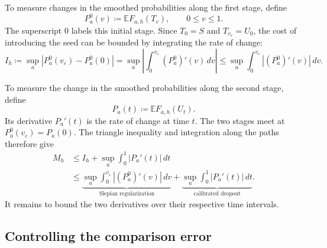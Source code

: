 \documentclass[11pt,letterpaper,twoside,leqno]{article}
\theoremstyle{bookplain}
\theoremstyle{bookremark}
\newcommand{\E}{\mathbb E}
\begin{document}
{
To measure changes in the smoothed probabilities along the first stage, {define}
\[
 P_a^0(v)\coloneqq\E F_{a,h}(T_v),\qquad 0\le v\le1.
\]
The superscript \(0\) labels this initial stage. Since
\(T_0=S\) and \(T_{v_\varepsilon}=U_0\), the cost of introducing the seed
can be bounded by integrating the rate of change:
\[
 I_h\coloneqq\sup_a|P_a^0(v_\varepsilon)-P_a^0(0)|
 =\sup_a\left|\int_0^{v_\varepsilon}(P_a^0)'(v)\,dv\right|
 \le\sup_a\int_0^{v_\varepsilon}|(P_a^0)'(v)|\,dv.
\]
}

{To measure the change in the smoothed probabilities along the
second stage, {define}}
\[
 P_a(t)\coloneqq\E F_{a,h}(U_t).
\]
{
Its derivative \(P_a'(t)\) is the rate of change at time \(t\).
The two stages meet at \(P_a^0(v_\varepsilon)=P_a(0)\).
The triangle inequality and integration along the paths therefore give
\begin{equation}
\begin{aligned}
 M_h&\le I_h+\sup_a\int_0^1|P_a'(t)|\,dt\\
 &\le
 \underbrace{\sup_a\int_0^{v_\varepsilon}|(P_a^0)'(v)|\,dv}
             _{\text{Slepian regularization}}
 +\underbrace{\sup_a\int_0^1|P_a'(t)|\,dt}
             _{\text{calibrated dropout}}.
\end{aligned}
\label{eq:roadmap}
\end{equation}
It remains to bound the two derivatives over their respective time intervals.
}

\subsection{Controlling the comparison error}
\label{sec:outline-seeded}
\end{document}
